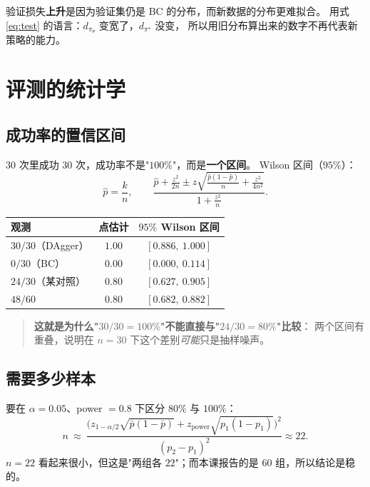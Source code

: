 验证损失\textbf{上升}是因为验证集仍是 BC 的分布，而新数据的分布更难拟合。
用式 \eqref{eq:test} 的语言：$d_{\pi_\theta}$ 变宽了，$d_{\pi^\star}$ 没变，
所以用旧分布算出来的数字不再代表新策略的能力。

\section{评测的统计学}

\subsection{成功率的置信区间}

$30$ 次里成功 $30$ 次，成功率不是"$100\%$"，而是\textbf{一个区间}。
Wilson 区间（$95\%$）：
\begin{equation}
  \hat p=\frac{k}{n},\qquad
  \frac{\hat p+\frac{z^2}{2n}\pm z\sqrt{\frac{\hat p(1-\hat p)}{n}+\frac{z^2}{4n^2}}}{1+\frac{z^2}{n}} .
\end{equation}

\begin{center}
\small
\begin{tabular}{@{}lcc@{}}
\toprule
观测 & 点估计 & $95\%$ Wilson 区间 \\
\midrule
$30/30$（DAgger） & $1.00$ & $[0.886,\ 1.000]$ \\
$0/30$（BC） & $0.00$ & $[0.000,\ 0.114]$ \\
$24/30$（某对照） & $0.80$ & $[0.627,\ 0.905]$ \\
$48/60$ & $0.80$ & $[0.682,\ 0.882]$ \\
\bottomrule
\end{tabular}
\end{center}

\begin{quote}
\textbf{这就是为什么"$30/30 = 100\%$"不能直接与"$24/30 = 80\%$"比较}：
两个区间有重叠，说明在 $n=30$ 下这个差别\emph{可能}只是抽样噪声。
\end{quote}

\subsection{需要多少样本}

要在 $\alpha=0.05$、power $=0.8$ 下区分 $80\%$ 与 $100\%$：
\begin{equation}
  n\ \approx\ \frac{\big(z_{1-\alpha/2}\sqrt{\bar p(1-\bar p)}
  +z_{\text{power}}\sqrt{p_1(1-p_1)}\big)^2}{(p_2-p_1)^2}\approx22 .
\end{equation}
$n=22$ 看起来很小，但这是"两组各 $22$"；而本课报告的是 $60$ 组，所以结论是稳的。

